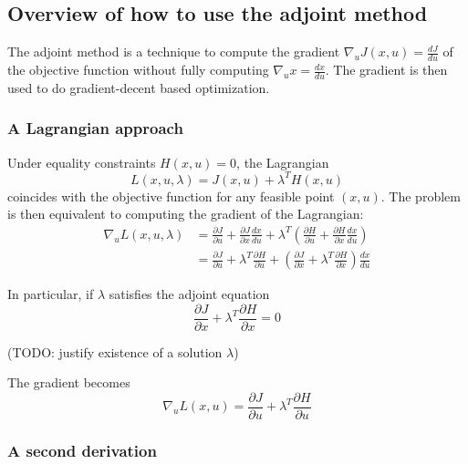 \subsection{Overview of how to use the adjoint method~\cite{Duffy2009}}

The adjoint method is a technique to compute the gradient $\nabla_u J(x, u) = \frac{d J}{d u}$ of the objective function without fully computing $\nabla_u x = \frac{d x}{d u}$. The gradient is then used to do gradient-decent based optimization. 

\subsubsection{A Lagrangian approach}

Under equality constraints $H(x, u) = 0$, the Lagrangian
\[
L(x,u, \lambda) = J(x, u) + \lambda^T H(x, u)
\]
coincides with the objective function for any feasible point $(x, u)$. The problem is then equivalent to computing the gradient of the Lagrangian:
\begin{align*}
\nabla_u L (x, u, \lambda)
&= \frac{\partial J}{\partial u} + \frac{\partial J}{\partial x}\frac{d x}{d u} + \lambda^T \left( \frac{\partial H}{\partial u} + \frac{\partial H}{\partial x}\frac{d x}{d u} \right) \\
&= \frac{\partial J}{\partial u} + \lambda^T \frac{\partial H}{\partial u} + \left( \frac{\partial J}{\partial x} + \lambda^T\frac{\partial H}{\partial x}\right) \frac{d x}{d u}
\label{eq:gradient1}
\end{align*}

In particular, if $\lambda$ satisfies the adjoint equation
\begin{equation}\label{eq:adjointEquation}
\frac{\partial J}{\partial x} + \lambda^T\frac{\partial H}{\partial x} = 0
\end{equation}

(TODO: justify existence of a solution $\lambda$)

The gradient becomes
\begin{equation}
\nabla_u L (x, u)
= \frac{\partial J}{\partial u} + \lambda^T \frac{\partial H}{\partial u}
\label{eq:gradient2}
\end{equation}


\subsubsection{A second derivation}

